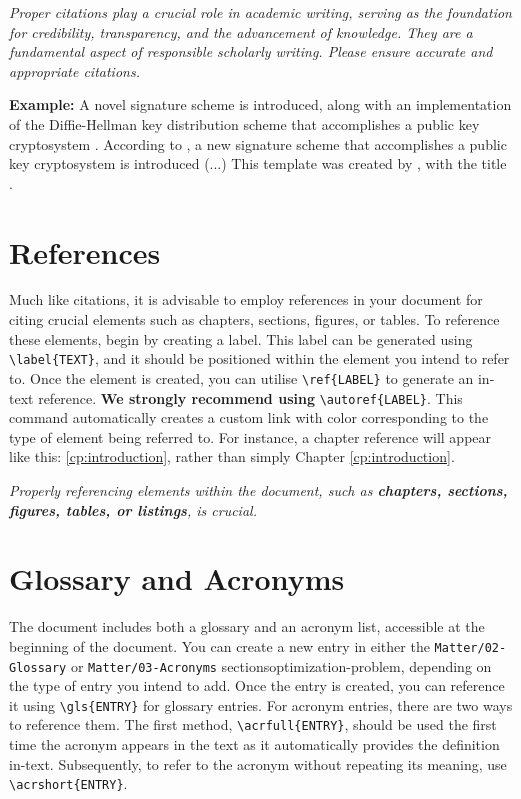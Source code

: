 {\begin{block}[tip]
\textit{Proper citations play a crucial role in academic writing, serving as the foundation for credibility, transparency, and the advancement of knowledge. They are a fundamental aspect of responsible scholarly writing. Please ensure accurate and appropriate citations.}
\end{block}

\noindent\textbf{Example:} A novel signature scheme is introduced, along with an implementation of the Diffie-Hellman key distribution scheme that accomplishes a public key cryptosystem \citep{kennedy1995particle}. According to \citet{kennedy1995particle}, a new signature scheme that accomplishes a public key cryptosystem is introduced (...) This template was created by \citeauthor{kennedy1995particle}, with the title .

\section{References}
Much like citations, it is advisable to employ references in your document for citing crucial elements such as chapters, sections, figures, or tables. To reference these elements, begin by creating a label. This label can be generated using \verb|\label{TEXT}|, and it should be positioned within the element you intend to refer to. Once the element is created, you can utilise \verb|\ref{LABEL}| to generate an in-text reference. \textbf{We strongly recommend using} \verb|\autoref{LABEL}|. This command automatically creates a custom link with color corresponding to the type of element being referred to. For instance, a chapter reference will appear like this: \autoref{cp:introduction}, rather than simply Chapter \ref{cp:introduction}. 

\begin{block}[tip]
\textit{Properly referencing elements within the document, such as \textbf{chapters, sections, figures, tables, or listings}, is crucial.}
\end{block}

\section{Glossary and Acronyms}
The document includes both a glossary and an acronym list, accessible at the beginning of the document. You can create a new entry in either the \verb|Matter/02-Glossary| or \verb|Matter/03-Acronyms| sections\gls{optimization-problem}, depending on the type of entry you intend to add. Once the entry is created, you can reference it using \verb|\gls{ENTRY}| for glossary entries. For acronym entries, there are two ways to reference them. The first method, \verb|\acrfull{ENTRY}|, should be used the first time the acronym appears in the text as it automatically provides the definition in-text. Subsequently, to refer to the acronym without repeating its meaning, use \verb|\acrshort{ENTRY}|.

}
